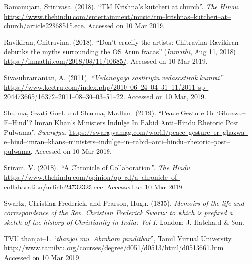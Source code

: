 \begin{thebibliography}{99}
  Ramanujam, Srinivasa. (2018). “TM Krishna’s kutcheri at church”. \textit{The Hindu}. \url{https://www.thehindu.com/entertainment/music/tm–krishnas–kutcheri–at–church/article22868515.ece}. Accessed on 10 Mar 2019.

  Ravikiran, Chitravina. (2018). “Don’t crucify the artists: Chitravina Ravikiran debunks the myths surrounding the OS Arun fracas” (\textit{Inmathi}, Aug 11, 2018) \url{https://inmathi.com/2018/08/11/10685/}. Accessed on 10 Mar 2019.

  Sivasubramanian, A. (2011). \textit{“Vedanāyaga sāstiriyin vedasāstirak kummi”} \url{https://www.keetru.com/index.php/2010–06–24–04–31–11/2011–sp–204473665/16372–2011–08–30–03–51–22}. Accessed on 10 Mar, 2019.

  Sharma, Swati Goel. and Sharma, Madhur. (2019). “Peace Gesture Or ‘Ghazwa–E–Hind’? Imran Khan’s Ministers Indulge In Rabid Anti–Hindu Rhetoric Post Pulwama”. \textit{Swarajya.} \url{https://swarajyamag.com/world/peace–gesture–or–ghazwa–e–hind–imran–khans–ministers–indulge–in–rabid–anti–hindu–rhetoric–post–pulwama}. Accessed on 10 Mar 2019.

  Sriram, V. (2018). \textit{“}A Chronicle of Collaboration\textit{”}. \textit{The Hindu}. \url{https://www.thehindu.com/opinion/op–ed/a–chronicle–of–collaboration/article24732325.ece}. Accessed on 10 Mar 2019.

  Swartz, Christian Frederick. and Pearson, Hugh. (1835). \textit{Memoirs of the life and correspondence of the Rev. Christian Frederick Swartz: to which is prefixed a sketch of the history of Christianity in India: Vol I}. London: J. Hatchard \& Son.

  TVU thanjai–1. “\textit{thanjai mu. Abraham pandithar}”, Tamil Virtual University. \url{http://www.tamilvu.org/courses/degree/d051/d0513/html/d0513661.htm} Accessed on 10 Mar 2019.

 \end{thebibliography}

\theendnotes

